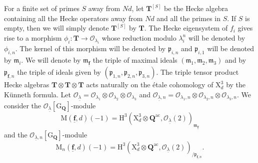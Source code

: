 \documentclass[10pt]{amsart}
\numberwithin{equation}{section}
\theoremstyle{plain}
\numberwithin{equation}{section}
\theoremstyle{definition}
\theoremstyle{remark}
\def\ac{\mathrm{ac}}
\def\frakm{\mathfrak{m}}
\def\Qbar{\QQ^{\ac}}
\def\ac{\mathrm{ac}}
\def\undlamb{\underline{\lambda}}
\def\triplef{\underline{\mathbf{f}}}
\def\calO{\mathcal{O}}
\def\frakm{\mathfrak{m}}
\def\frakp{\mathfrak{p}}
\def\QQ{\mathbf{Q}}
\def\TT{\mathbf{T}}
\def\rmG{\mathrm{G}}
\def\rmH{\mathrm{H}}
\def\rmM{\mathrm{M}}
\def\rmX{\mathrm{X}}
\begin{document}
For a finite set of primes $S$ away from $Nd$, let $\TT^{[S]}$ be the Hecke algebra containing all the Hecke operators away from $Nd$ and all the primes in $S$. If $S$ is empty, then we will simply denote $\TT^{[S]}$ by $\TT$. The Hecke eigensystem of $f_{i}$ gives rise to a morphism $\phi_{i}: \TT\rightarrow\calO_{\lambda_{i}}$ whose reduction modulo $\lambda^{n}_{i}$ will be denoted by $\phi_{i, n}$. The kernel of this morphism will be denoted by $\frakp_{i, n}$ and  $\frakp_{i, 1}$ will be denoted by $\frakm_{i}$. We will denote by $\frakm_{\triplef}$ the triple of maximal ideals $(\frakm_{1}, \frakm_{2}, \frakm_{3})$ and by $\frakp_{\triplef,n}$ the triple of ideals given by $(\frakp_{1, n}, \frakp_{2, n}, \frakp_{3, n})$.  The triple tensor product Hecke algebras $\TT\otimes\TT\otimes \TT$  acts naturally on the \'etale cohomology of $\rmX^{3}_{d}$ by the K\"{u}nneth formula. Let $\calO_{\undlamb}=\calO_{{\lambda_{1}}}\otimes \calO_{{\lambda_{2}}}\otimes \calO_{{\lambda_{3}}}$ and $\calO_{\undlamb, n}=\calO_{\lambda_{1}, n}\otimes \calO_{\lambda_{2}, n}\otimes \calO_{\lambda_{3}, n}$.  We consider the $\calO_{\underline{\lambda}}[\rmG_{\QQ}]$-module 
\begin{equation*}
\rmM(\triplef, d)(-1)= \rmH^{3}(\rmX^{3}_{d}\otimes\Qbar, \calO_{\undlamb}(2))_{\frakm_{\triplef}}
\end{equation*}
and the $\calO_{\underline{\lambda}, n}[\rmG_{\QQ}]$-module
\begin{equation*}
\rmM_{n}(\triplef, d)(-1) = \rmH^{3}(\rmX^{3}_{d}\otimes {\Qbar}, \calO_{\undlamb}(2))_{/\frakp_{\triplef, n}}.
\end{equation*}
\end{document}
